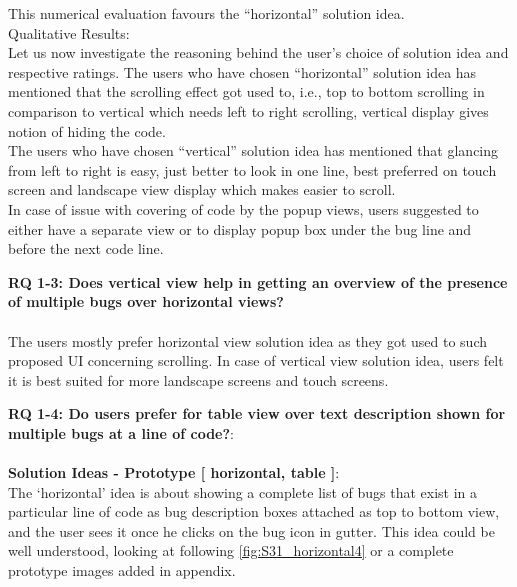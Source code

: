 This numerical evaluation favours the “horizontal” solution idea. \\

Qualitative Results: \\

Let us now investigate the reasoning behind the user’s choice of solution idea and respective ratings. The users who have chosen “horizontal” solution idea has mentioned that the scrolling effect got used to, i.e., top to bottom scrolling in comparison to vertical which needs left to right scrolling, vertical display gives notion of hiding the code. \\ 
The users who have chosen “vertical” solution idea has mentioned that glancing from left to right is easy, just better to look in one line, best preferred on touch screen and landscape view display which makes easier to scroll. \\

In case of issue with covering of code by the popup views, users suggested to either have a separate view or to display popup box under the bug line and before the next code line. \\

\begin{myboxi}{{\textbf{RQ 1-3: Does vertical view help in getting an overview of the presence of multiple bugs over horizontal views?}}}
	\\ \\ The users mostly prefer horizontal view solution idea as they got used to such proposed UI concerning scrolling. In case of vertical view solution idea, users felt it is best suited for more landscape screens and touch screens.
\end{myboxi}


\clearpage
\textbf{RQ 1-4: Do users prefer for table view over text description shown for multiple bugs at a line of code?}: \\ \\

\textbf{Solution Ideas - Prototype [ horizontal, table ]}: \\

The ‘horizontal’ idea is about showing a complete list of bugs that exist in a particular line of code as bug description boxes attached as top to bottom view, and the user sees it once he clicks on the bug icon in gutter. This idea could be well understood, looking at following \autoref{fig:S31_horizontal4} or a complete prototype images added in appendix. \\


